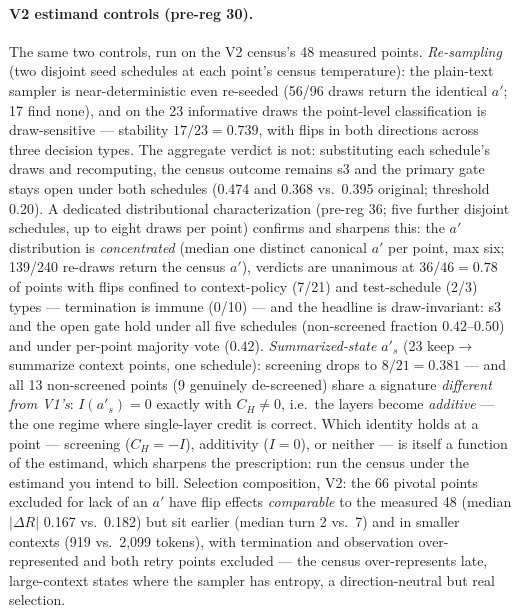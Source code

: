 \documentclass{article}
\theoremstyle{remark}
\begin{document}
\paragraph{V2 estimand controls (pre-reg 30).} The same two controls, run
on the V2 census's 48 measured points. \emph{Re-sampling} (two disjoint
seed schedules at each point's census temperature): the plain-text sampler
is near-deterministic even re-seeded (56/96 draws return the identical
$a'$; 17 find none), and on the 23 informative draws the point-level
classification is draw-sensitive --- stability $17/23 = 0.739$, with flips
in both directions across three decision types. The aggregate verdict is
not: substituting each schedule's draws and recomputing, the census
outcome remains s3 and the primary gate stays open under both schedules
(0.474 and 0.368 vs.\ 0.395 original; threshold 0.20). A dedicated
distributional characterization (pre-reg 36; five further disjoint
schedules, up to eight draws per point) confirms and sharpens this: the
$a'$ distribution is \emph{concentrated} (median one distinct canonical
$a'$ per point, max six; 139/240 re-draws return the census $a'$),
verdicts are unanimous at $36/46 = 0.78$ of points with flips confined to
context-policy (7/21) and test-schedule (2/3) types --- termination is
immune (0/10) --- and the headline is draw-invariant: s3 and the open gate
hold under all five schedules (non-screened fraction $0.42$--$0.50$) and
under per-point majority vote ($0.42$).
\emph{Summarized-state} $a'_s$ (23 keep$\to$summarize context points, one
schedule): screening drops to $8/21 = 0.381$ --- and all 13 non-screened
points (9 genuinely de-screened) share a signature \emph{different from
V1's}: $I(a'_s) = 0$ exactly with $C_H \neq 0$, i.e.\ the layers become
\emph{additive} --- the one regime where single-layer credit is correct.
Which identity holds at a point --- screening ($C_H = -I$), additivity
($I = 0$), or neither --- is itself a function of the estimand, which
sharpens the prescription: run the census under the estimand you intend
to bill. Selection composition, V2: the 66 pivotal points excluded for
lack of an $a'$ have flip effects \emph{comparable} to the measured 48
(median $|\Delta R|$ 0.167 vs.\ 0.182) but sit earlier (median turn 2
vs.\ 7) and in smaller contexts (919 vs.\ 2{,}099 tokens), with
termination and observation over-represented and both retry points
excluded --- the census over-represents late, large-context states where
the sampler has entropy, a direction-neutral but real selection.
\end{document}

